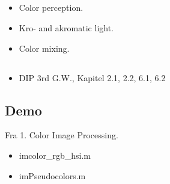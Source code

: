 \subsection{\subtopics}

\begin{itemize}
	\item Color perception.
	\item Kro- and akromatic light.
	\item Color mixing.
\end{itemize}

\subsection{\curriculum}

\begin{itemize}
	\item DIP 3rd G.W., Kapitel 2.1, 2.2, 6.1, 6.2
\end{itemize}

\subsection{Demo}

Fra 1. Color Image Processing.

\begin{itemize}
	\item imcolor\_rgb\_hsi.m
	\item imPseudocolors.m
\end{itemize}
